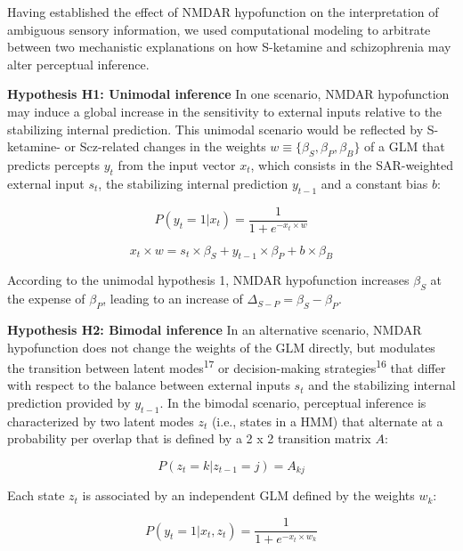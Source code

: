 \documentclass[
]{article}
\begin{document}
Having established the effect of NMDAR hypofunction on the
interpretation of ambiguous sensory information, we used computational
modeling to arbitrate between two mechanistic explanations on how
S-ketamine and schizophrenia may alter perceptual inference.

\textbf{Hypothesis H1: Unimodal inference} In one scenario, NMDAR
hypofunction may induce a global increase in the sensitivity to external
inputs relative to the stabilizing internal prediction. This unimodal
scenario would be reflected by S-ketamine- or Scz-related changes in the
weights \(w \equiv \{\beta_S, \beta_P, \beta_B\}\) of a GLM that
predicts percepts \(y_t\) from the input vector \(x_t\), which consists
in the SAR-weighted external input \(s_t\), the stabilizing internal
prediction \(y_{t-1}\) and a constant bias \(b\):

\begin{equation}
P(y_t = 1 | x_t) = \frac{1}{1 + e^{-x_t \times w}} 
\end{equation}

\begin{equation}
x_t \times w =  s_t \times \beta_S + y_{t-1} \times \beta_P  + b \times \beta_B  
\end{equation}

According to the unimodal hypothesis 1, NMDAR hypofunction increases
\(\beta_S\) at the expense of \(\beta_P\), leading to an increase of
\(\Delta_{S-P} = \beta_S - \beta_P\).

\textbf{Hypothesis H2: Bimodal inference} In an alternative scenario,
NMDAR hypofunction does not change the weights of the GLM directly, but
modulates the transition between latent modes\textsuperscript{17} or
decision-making strategies\textsuperscript{16} that differ with respect
to the balance between external inputs \(s_t\) and the stabilizing
internal prediction provided by \(y_{t-1}\). In the bimodal scenario,
perceptual inference is characterized by two latent modes \(z_t\) (i.e.,
states in a HMM) that alternate at a probability per overlap that is
defined by a 2 x 2 transition matrix \(A\):

\begin{equation}
P(z_t = k|z_{t-1} = j) = A_{kj} 
\end{equation}

Each state \(z_t\) is associated by an independent GLM defined by the
weights \(w_k\):

\begin{equation}
P(y_t = 1 | x_t, z_t) = \frac{1}{1 + e^{-x_t \times w_k}} 
\end{equation}
\end{document}
